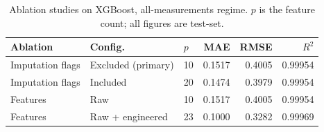 \begin{table}[!t]
    \centering
    \caption{Ablation studies on XGBoost, all-measurements regime. $p$ is the feature count; all figures are test-set.}
    \label{tab:ablation}
    \small
    \setlength{\tabcolsep}{4pt}
    \begin{tabular}{lllrrr}
        \toprule
        Ablation & Config. & $p$ & MAE & RMSE & $R^2$ \\
        \midrule
        Imputation flags & Excluded (primary) & 10 & 0.1517 & 0.4005 & 0.99954 \\
        Imputation flags & Included & 20 & 0.1474 & 0.3979 & 0.99954 \\
        Features & Raw & 10 & 0.1517 & 0.4005 & 0.99954 \\
        Features & Raw + engineered & 23 & 0.1000 & 0.3282 & 0.99969 \\
        \bottomrule
    \end{tabular}
\end{table}
